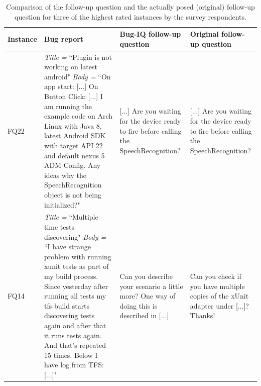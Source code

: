 \begin{table}[t]
	\scriptsize
	\centering
	\caption{Comparison of the \evpi follow-up question and the actually posed (original) follow-up question for three of the highest rated instances by the survey respondents.}
	\begin{tabular}{ |M{1cm}|p{7.3cm}|p{4cm}|p{4cm}|  }		\hline
		Instance &Bug report & Bug-IQ follow-up question & Original follow-up question\\		\hline

		FQ22
		&{\em Title =} ``Plugin is not working on latest android" \newline
		{\em Body =} ``On app start: [...] \newline
		On Button Click: [...] \newline
		I am running the example code on Arch Linux with Java 8, latest Android SDK with target API 22 and default nexus 5 ADM Config.
		Any ideas why the SpeechRecognition object is not being initialized?"
		& [...] Are you waiting for the device ready to fire before calling the SpeechRecognition?
		& [...] Are you waiting for the device ready to fire before calling the SpeechRecognition?\\ \hline

		FQ14
		&{\em Title =} ``Multiple time tests discovering" \newline
		{\em Body =} ``I have strange problem with running xunit tests as part of my build process. Since yesterday after running all tests my tfs build starts discovering tests again and after that it runs tests again. And that's repeated 15 times.
		Below I have log from TFS: [...]"
		& Can you describe your scenario a little more? One way of doing this is described in [...]
		& Can you check if you have multiple copies of the xUnit adapter under [...]? Thanks! \\ \hline
		

\end{tabular}
\end{table}
